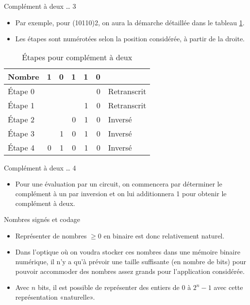 \documentclass[presentation]{beamer}
\begin{document}
\begin{frame}[label={sec:orgc67cd51}]{Complément à deux \ldots{} 3}
\begin{itemize}
\item Par exemple, pour (10110)2, on aura la démarche détaillée dans le tableau \ref{tab:orge014b7c}.

\item Les étapes sont numérotées selon la position considérée, à partir de la droite.
\end{itemize}

\begin{table}[htbp]
\caption{\label{tab:orge014b7c}Étapes pour complément à deux}
\centering
\begin{tabular}{lrrrrrl}
Nombre & 1 & 0 & 1 & 1 & 0 & \\
\hline
Étape 0 &  &  &  &  & 0 & Retranscrit\\
Étape 1 &  &  &  & 1 & 0 & Retranscrit\\
Étape 2 &  &  & 0 & 1 & 0 & Inversé\\
Étape 3 &  & 1 & 0 & 1 & 0 & Inversé\\
Étape 4 & 0 & 1 & 0 & 1 & 0 & Inversé\\
\end{tabular}
\end{table}
\end{frame}

\begin{frame}[label={sec:org97877de}]{Complément à deux \ldots{} 4}
\begin{itemize}
\item Pour une évaluation par un circuit, on commencera par déterminer le complément à un par inversion et on lui additionnera 1 pour obtenir le complément à deux.
\end{itemize}
\end{frame}

\begin{frame}[label={sec:orgb75e1a6}]{Nombres signés et codage}
\begin{itemize}
\item Représenter de nombres \(\geq 0\) en binaire est donc relativement naturel.

\item Dans l'optique où on voudra stocker ces nombres dans une mémoire binaire numérique, il n'y a qu'à prévoir une taille suffisante (en nombre de bits) pour pouvoir accommoder des nombres assez grands pour l'application considérée.

\item Avec \(n\) bits, il est possible de représenter des entiers de 0 à \(2^n-1\) avec cette représentation «naturelle».
\end{itemize}
\end{frame}
\end{document}
